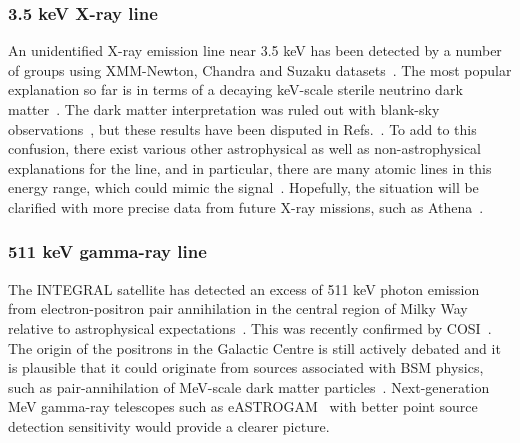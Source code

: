 \documentclass[10pt]{article}
\begin{document}
\subsubsection{3.5 keV X-ray line}
An unidentified X-ray emission line near 3.5 keV has been detected by a number of groups using XMM-Newton, Chandra and Suzaku datasets~\cite{Bulbul:2014sua, Boyarsky:2014jta, Boyarsky:2014ska, Urban:2014yda, Franse:2016dln, Cappelluti:2017ywp, Hofmann:2019ihc, Sicilian:2020glg}. The most popular explanation so far is in terms of a decaying keV-scale sterile neutrino dark matter~\cite{Abazajian:2017tcc, Boyarsky:2018tvu}. The dark matter interpretation was ruled out with blank-sky observations~\cite{Dessert:2018qih}, but these results have been disputed in Refs.~\cite{Abazajian:2020unr, Boyarsky:2020hqb}. To add to this confusion, there exist various other astrophysical as well as non-astrophysical explanations for the line, and in particular, there are many atomic lines in this energy range, which could mimic the signal~\cite{Jeltema:2014qfa}. Hopefully, the situation will be clarified with more precise data from future X-ray missions, such as Athena~\cite{Nandra:2013jka}. 

\subsubsection{511 keV gamma-ray line}
The INTEGRAL satellite has detected an excess of 511 keV photon emission from electron-positron pair annihilation in the central region of Milky Way relative to astrophysical expectations~\cite{Weidenspointner:2008zz, Siegert:2015knp}. This was recently confirmed by COSI~\cite{Kierans:2019aqz}. The origin of the positrons in the Galactic Centre is still actively debated and it is plausible that it could originate from sources associated with BSM physics, such as pair-annihilation of MeV-scale dark matter particles~\cite{Boehm:2003bt}. Next-generation MeV gamma-ray telescopes such as eASTROGAM~\cite{e-ASTROGAM:2017pxr} with better point source detection sensitivity would provide a clearer picture.
\end{document}
